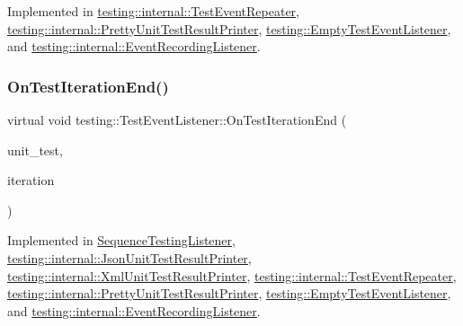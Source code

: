 Implemented in \mbox{\hyperlink{classtesting_1_1internal_1_1TestEventRepeater_aa0f13bded9369aae1c78583d7276f8b1}{testing\+::internal\+::\+Test\+Event\+Repeater}}, \mbox{\hyperlink{classtesting_1_1internal_1_1PrettyUnitTestResultPrinter_a06749ff2b32a16c127374ecd015f13e0}{testing\+::internal\+::\+Pretty\+Unit\+Test\+Result\+Printer}}, \mbox{\hyperlink{classtesting_1_1EmptyTestEventListener_afd58d21005f0d0d0399fb114627545d3}{testing\+::\+Empty\+Test\+Event\+Listener}}, and \mbox{\hyperlink{classtesting_1_1internal_1_1EventRecordingListener_adb076f145cc20d9b27441b9c75da4b81}{testing\+::internal\+::\+Event\+Recording\+Listener}}.

\mbox{\label{classtesting_1_1TestEventListener_a550fdb3e55726e4cefa09f5697941425}} 
\subsubsection{\texorpdfstring{OnTestIterationEnd()}{OnTestIterationEnd()}}
{\footnotesize\ttfamily virtual void testing\+::\+Test\+Event\+Listener\+::\+On\+Test\+Iteration\+End (\begin{DoxyParamCaption}\item[{const \mbox{\hyperlink{classtesting_1_1UnitTest}{Unit\+Test}} \&}]{unit\+\_\+test,  }\item[{int}]{iteration }\end{DoxyParamCaption})\hspace{0.3cm}{\ttfamily [pure virtual]}}



Implemented in \mbox{\hyperlink{classSequenceTestingListener_a783bc01e2a95f5bf73bbde4d96832e0f}{Sequence\+Testing\+Listener}}, \mbox{\hyperlink{classtesting_1_1internal_1_1JsonUnitTestResultPrinter_a44edb54cf1ab8cdcd56bda5058b8f1d6}{testing\+::internal\+::\+Json\+Unit\+Test\+Result\+Printer}}, \mbox{\hyperlink{classtesting_1_1internal_1_1XmlUnitTestResultPrinter_a2ae986dd2f4f2aed31cc6f3bc8c56898}{testing\+::internal\+::\+Xml\+Unit\+Test\+Result\+Printer}}, \mbox{\hyperlink{classtesting_1_1internal_1_1TestEventRepeater_a94253e3c11753328e8a031f39352708f}{testing\+::internal\+::\+Test\+Event\+Repeater}}, \mbox{\hyperlink{classtesting_1_1internal_1_1PrettyUnitTestResultPrinter_ac29b30216023baddda04ef5889f484ff}{testing\+::internal\+::\+Pretty\+Unit\+Test\+Result\+Printer}}, \mbox{\hyperlink{classtesting_1_1EmptyTestEventListener_a2253e5a18b3cf7bccd349567a252209d}{testing\+::\+Empty\+Test\+Event\+Listener}}, and \mbox{\hyperlink{classtesting_1_1internal_1_1EventRecordingListener_ab0cc007bcfaf06cd383d574c88f62aea}{testing\+::internal\+::\+Event\+Recording\+Listener}}.

